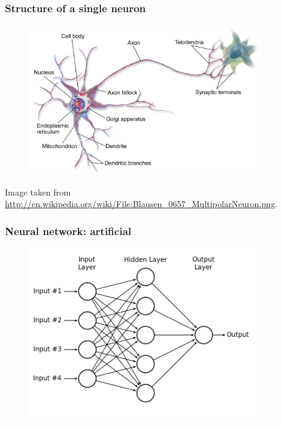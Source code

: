 \begin{frame}
	\frametitle{Structure of a single neuron}
	\begin{figure}[!h]
		\centering
		\includegraphics[width=0.9\textwidth]{img/Blausen_0657_MultipolarNeuron.png}
	\end{figure}
	\tiny{Image taken from \url{http://en.wikipedia.org/wiki/File:Blausen_0657_MultipolarNeuron.png}}.
\end{frame}


\begin{frame}
	\frametitle{Neural network: artificial}
	\begin{figure}[!h]
		\centering
		\includegraphics[width=0.9\textwidth]{img/fig_neural_network_1.png}
	\end{figure}
\end{frame}




